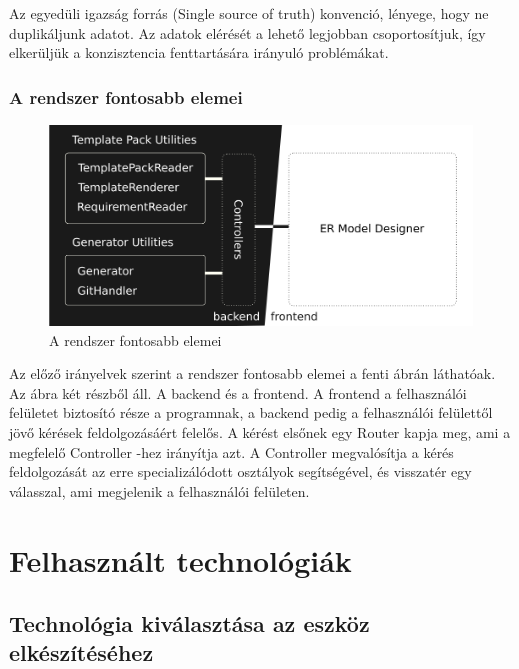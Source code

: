 \documentclass[a4paper,12pt,oneside]{report}
\begin{document}
\begin{justify}
	Az egyedüli igazság forrás (Single source of truth) konvenció, lényege, hogy ne duplikáljunk adatot. Az adatok elérését a lehető legjobban csoportosítjuk, így elkerüljük a konzisztencia fenttartására irányuló problémákat.



\end{justify}
\newpage
\subsubsection{A rendszer fontosabb elemei}


\begin{justify}

	\begin{figure}[h]
		\includegraphics[width=\textwidth]{contents/images/components.png}
		\caption{A rendszer fontosabb elemei}
		\label{fig:components}
	\end{figure}

	Az előző irányelvek szerint a rendszer fontosabb elemei a fenti ábrán láthatóak. Az ábra két részből áll. A backend és a frontend. A frontend a felhasználói felületet biztosító része a programnak, a backend pedig a felhasználói felülettől jövő kérések feldolgozásáért felelős. A kérést elsőnek egy Router kapja meg, ami a megfelelő Controller -hez irányítja azt. A Controller megvalósítja a kérés feldolgozását az erre specializálódott osztályok segítségével, és visszatér egy válasszal, ami megjelenik a felhasználói felületen. 


\end{justify}
\newpage
\section{Felhasznált technológiák}
\subsection{Technológia kiválasztása az eszköz elkészítéséhez}
\end{document}
